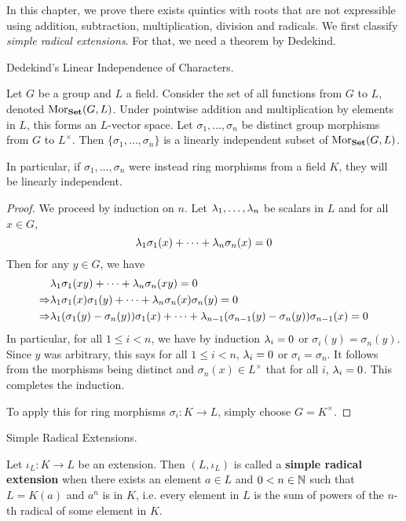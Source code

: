 \documentclass[../book.tex]{subfiles}
\begin{document}
In this chapter, we prove there exists quintics
with roots that are not expressible using 
addition, subtraction, multiplication, division and radicals. 
We first classify \emph{simple radical extensions}.
For that, we need a theorem by Dedekind. 

\begin{thm} Dedekind's Linear Independence of Characters. 
    
    Let $G$ be a group and $L$ a field.
    Consider the set of all functions from $G$ to $L$, denoted $\mathrm{Mor}_{\mathbf{Set}}(G, L)$.
    Under pointwise addition and multiplication by elements in $L$,
    this forms an $L$-vector space. 
    Let $\sigma_1,\dots,\sigma_n$ be distinct group morphisms from $G$ to $L^\times$.
    Then $\{\sigma_1,\dots,\sigma_n\}$ is a linearly independent subset 
    of $\mathrm{Mor}_{\mathbf{Set}}(G, L)$.
    
    In particular, 
    if $\sigma_1,\dots,\sigma_n$ were instead ring morphisms from a field $K$,
    they will be linearly independent. 
\end{thm}
\begin{proof}
    
    We proceed by induction on $n$. 
    Let $\lambda_1,\dots,\lambda_n$ be scalars in $L$ and for all $x \in G$, 
    \[ \lambda_1 \sigma_1(x) + \cdots + \lambda_n \sigma_n(x) = 0 \]
    Then for any $y \in G$, we have \begin{align*}
        & \lambda_1 \sigma_1(xy) + \cdots + \lambda_n \sigma_n(xy) = 0 \\
        \Rightarrow 
        & \lambda_1\sigma_1(x)\sigma_1(y) + \cdots + \lambda_n\sigma_n(x)\sigma_n(y) = 0 \\
        \Rightarrow 
        & \lambda_1(\sigma_1(y) - \sigma_n(y))\sigma_1(x) + \cdots
        + \lambda_{n-1}(\sigma_{n-1}(y) - \sigma_n(y))\sigma_{n-1}(x) = 0 
    \end{align*}
    In particular, for all $1 \leq i < n$, we have by induction
    $\lambda_i = 0$ or $\sigma_i(y) = \sigma_n(y)$.
    Since $y$ was arbitrary, this says for all $1 \leq i < n$, 
    $\lambda_i = 0$ or $\sigma_i = \sigma_n$. 
    It follows from the morphisms being distinct and $\sigma_n(x) \in L^\times$ that
    for all $i$, $\lambda_i = 0$. 
    This completes the induction. 
    
    To apply this for ring morphisms $\sigma_i : K \to L$, 
    simply choose $G = K^\times$. 
\end{proof}
\begin{dfn} Simple Radical Extensions. 
    
    Let $\iota_L : K \to L$ be an extension.
    Then $(L,\iota_L)$ is called a \textbf{simple radical extension} when
    there exists an element $a \in L$ and $0 < n \in \mathbb{N}$ such that 
    $L = K(a)$ and $a^n$ is in $K$,
    i.e. every element in $L$ is the sum of powers of 
    the $n$-th radical of some element in $K$. 
    
\end{dfn}
\end{document}
